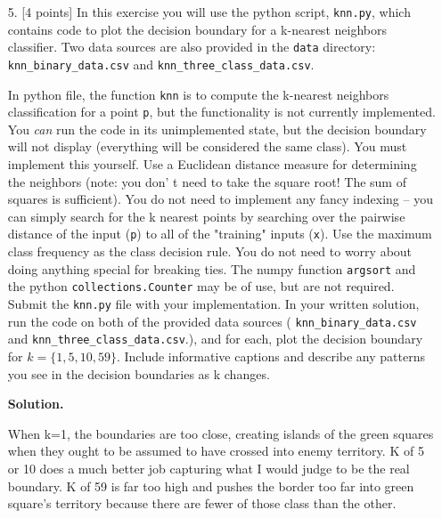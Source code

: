 \documentclass[10pt]{article}
\begin{document}
\begin{itemize}


\item[5.]  [4 points]
In this exercise you will use the python script, {\tt knn.py}, which contains code to plot the decision boundary for a k-nearest neighbors classifier.  Two data sources are also provided in the {\tt data} directory: {\tt knn\_binary\_data.csv} and {\tt knn\_three\_class\_data.csv}.

In python file, the function {\tt knn} is to compute the k-nearest neighbors classification for a point {\tt p}, but the functionality is not currently implemented.  You \emph{can} run the code in its unimplemented state, but the decision boundary will not display (everything will be considered the same class).  You must implement this yourself.  Use a Euclidean distance measure for determining the neighbors (note: you don' t need to take the square root! The sum of squares is sufficient).  You do not need to implement any fancy indexing -- you can simply search for the k nearest points by searching over the pairwise distance of the input ({\tt p}) to all of the "training" inputs ({\tt x}).  Use the maximum class frequency as the class decision rule.  You do not need to worry about doing anything special for breaking ties.  The numpy function {\tt argsort} and the python {\tt collections.Counter} may be of use, but are not required.  Submit the {\tt knn.py} file with your implementation.  In your written solution, run the code on both of the provided data sources ( {\tt knn\_binary\_data.csv} and {\tt knn\_three\_class\_data.csv}.), and for each, plot the decision boundary for $k = \{1, 5, 10, 59\}$.  Include informative captions and describe any patterns you see in the decision boundaries as k changes.

{\bf Solution.}

When k=1, the boundaries are too close, creating islands of the green squares when they ought to be assumed to have crossed into enemy territory. K of 5 or 10 does a much better job capturing what I would judge to be the real boundary. K of 59 is far too high and pushes the border too far into green square's territory because there are fewer of those class than the other.


\end{itemize}
\end{document}
